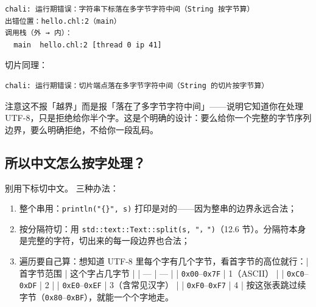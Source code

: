 \par
\medskip
\begin{lstlisting}[style=out]
chali: 运行期错误：字符串下标落在多字节字符中间（String 按字节算）
出错位置：hello.chl:2（main）
调用栈（外 → 内）：
  main  hello.chl:2 [thread 0 ip 41]
\end{lstlisting}
\par
\medskip

切片同理：

\par
\medskip
\begin{lstlisting}[style=out]
chali: 运行期错误：切片端点落在多字节字符中间（String 的切片按字节算）
\end{lstlisting}
\par
\medskip

注意这不报「越界」而是报「落在了多字节字符中间」——说明它知道你在处理 UTF-8，只是拒绝给你半个字。这是个明确的设计：要么给你一个完整的字节序列边界，要么明确拒绝，不给你一段乱码。

\subsection*{所以中文怎么按字处理？}

别用下标切中文。 三种办法：

\begin{enumerate}

\item 整个串用：\texttt{println(\allowbreak{}"\{\}",\allowbreak{} s)\allowbreak{}} 打印是对的——因为整串的边界永远合法；

\item 按分隔符切：用 \texttt{std:\allowbreak{}:\allowbreak{}text:\allowbreak{}:\allowbreak{}Text:\allowbreak{}:\allowbreak{}split(\allowbreak{}s,\allowbreak{} "，")\allowbreak{}}（12.6 节）。分隔符本身是完整的字符，切出来的每一段边界也合法；

\item 遍历要自己算：想知道 UTF-8 里每个字有几个字节，看首字节的高位就行：| 首字节范围 | 这个字占几字节 | | --- | --- | | \texttt{0x00}–\texttt{0x7F} | 1（ASCII） | | \texttt{0x\allowbreak{}C0}–\texttt{0x\allowbreak{}DF} | 2 | | \texttt{0x\allowbreak{}E0}–\texttt{0x\allowbreak{}EF} | 3（含常见汉字） | | \texttt{0x\allowbreak{}F0}–\texttt{0x\allowbreak{}F7} | 4 | 按这张表跳过续字节（\texttt{0x80}–\texttt{0x\allowbreak{}BF}），就能一个个字地走。

\end{enumerate}


